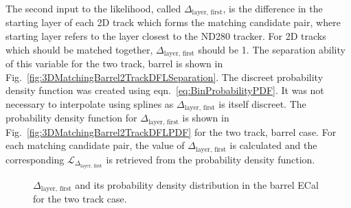 The second input to the likelihood, called $\Delta_{\textrm{layer, first}}$, is the difference in the starting layer of each 2D track which forms the matching candidate pair, where starting layer refers to the layer closest to the ND280 tracker.  For 2D tracks which should be matched together, $\Delta_{\textrm{layer, first}}$ should be 1.  The separation ability of this variable for the two track, barrel is shown in Fig.~\ref{fig:3DMatchingBarrel2TrackDFLSeparation}.  The discreet probability density function was created using eqn.~\ref{eq:BinProbabilityPDF}.  It was not necessary to interpolate using splines as $\Delta_{\textrm{layer, first}}$ is itself discreet.  The probability density function for $\Delta_{\textrm{layer, first}}$ is shown in Fig.~\ref{fig:3DMatchingBarrel2TrackDFLPDF} for the two track, barrel case.  For each matching candidate pair, the value of $\Delta_{\textrm{layer, first}}$ is calculated and the corresponding $\mathcal{L}_{\Delta_{\textrm{layer, first}}}$ is retrieved from the probability density function.
\begin{figure}%
  \centering
  \caption{$\Delta_{\textrm{layer, first}}$ and its probability density distribution in the barrel ECal for the two track case.}
  \label{fig:DFL}
\end{figure}
